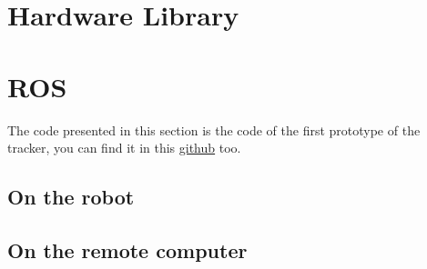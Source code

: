 
\appendix

\chapter{Hardware Library}\label{hardwarelib}

\lstset{language=Python}


\chapter{ROS}

The code presented in this section is the code of the
first prototype of the tracker, you can find it in this \href{https://github.com/klipfel/tracker-v1}{github}
too.

	\section{On the robot}
	
	
	
	
	
	\section{On the remote computer}
	
	\lstset{language=Python,basicstyle=\tiny\ttfamily\upshape}
	
	
	